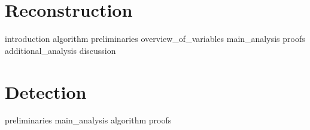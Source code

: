\documentclass[a4paper, openany, oneside]{memoir}
\begin{document}
\chapter{Reconstruction}

{introduction}
{algorithm}
{preliminaries}
{overview_of_variables}
{main_analysis}
{proofs}
{additional_analysis}
{discussion}


\chapter{Detection}

{preliminaries}
{main_analysis}
{algorithm}
{proofs}
\end{document}
